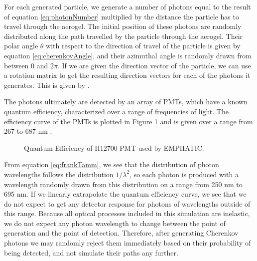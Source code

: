 For each generated particle, we generate a number of photons equal to the result of equation \ref{eq:photonNumber} multiplied by the distance the particle has to travel through the aerogel.
The initial position of these photons are randomly distributed along the path travelled by the particle through the aerogel.
Their polar angle $\theta$ with respect to the direction of travel of the particle is given by equation \ref{eq:cherenkovAngle}, and their azimuthal angle is randomly drawn from between 0 and $2\pi$.
If we are given the direction vector of the particle, we can use a rotation matrix to get the resulting direction vectors for each of the photons it generates.
This is given by .

The photons ultimately are detected by an array of PMTs, which have a known quantum efficiency, characterized over a range of frequencies of light.
The efficiency curve of the PMTs is plotted in Figure \ref{fig:qEff} and is given over a range from 267 to 687 nm  \cite{H12700} .

\begin{figure}[]
\centering
{}
\caption[Quantum Efficiency of H12700 PMT used by EMPHATIC.]{Quantum Efficiency of H12700 PMT used by EMPHATIC.}
\label{fig:qEff} 
\end{figure}

From equation \ref{eq:frankTamm}, we see that the distribution of photon wavelengths follows the distribution $1/\lambda^2$, so each photon is produced with a wavelength randomly drawn from this distribution on a range from 250 nm to 695 nm.
If we linearly extrapolate the quantum efficiency curve, we see that we do not expect to get any detector response for photons of wavelengths outside of this range.
Because all optical processes included in this simulation are inelastic, we do not expect any photon wavelength to change between the point of generation and the point of detection.
Therefore, after generating Cherenkov photons we may randomly reject them immediately based on their probability of being detected, and not simulate their paths any further.

